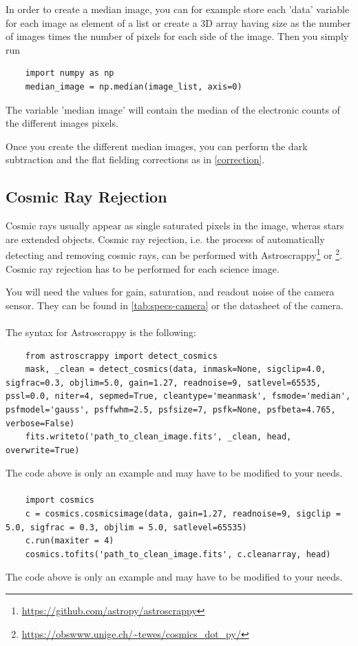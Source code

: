 \documentclass[a4paper, 11pt, fleqn]{memoir}
\begin{document}
In order to create a median image, you can for example store each 'data' variable for each image as element of a list or create a 3D array having size as the number of images times the number of pixels for each side of the image.
Then you simply run
\begin{verbatim}
    import numpy as np
    median_image = np.median(image_list, axis=0)
\end{verbatim}
The variable 'median image' will contain the median of the electronic counts of the different images pixels.


Once you create the different median images, you can perform the dark subtraction and the flat fielding corrections as in \ref{correction}.

\subsection{Cosmic Ray Rejection}
Cosmic rays usually appear as single saturated pixels in the image, wheras stars are extended objects.
Cosmic ray rejection, i.e. the process of automatically detecting and removing cosmic rays, can be performed with Astroscrappy\footnote{\url{https://github.com/astropy/astroscrappy}} or \footnote{\url{https://obswww.unige.ch/~tewes/cosmics_dot_py/}}.
Cosmic ray rejection has to be performed for each science image.

You will need the values for gain, saturation, and readout noise of the camera sensor.
They can be found in \cref{tab:specs-camera} or the datasheet of the camera.

\paragraph{}
The syntax for Astroscrappy is the following:
\begin{verbatim}
    from astroscrappy import detect_cosmics
    mask, _clean = detect_cosmics(data, inmask=None, sigclip=4.0, sigfrac=0.3, objlim=5.0, gain=1.27, readnoise=9, satlevel=65535, pssl=0.0, niter=4, sepmed=True, cleantype='meanmask', fsmode='median', psfmodel='gauss', psffwhm=2.5, psfsize=7, psfk=None, psfbeta=4.765, verbose=False)
    fits.writeto('path_to_clean_image.fits', _clean, head, overwrite=True)
\end{verbatim}
The code above is only an example and may have to be modified to your needs.

\paragraph{}
\begin{verbatim}
    import cosmics
    c = cosmics.cosmicsimage(data, gain=1.27, readnoise=9, sigclip = 5.0, sigfrac = 0.3, objlim = 5.0, satlevel=65535)
    c.run(maxiter = 4)
    cosmics.tofits('path_to_clean_image.fits', c.cleanarray, head)
\end{verbatim}
The code above is only an example and may have to be modified to your needs.
\end{document}
